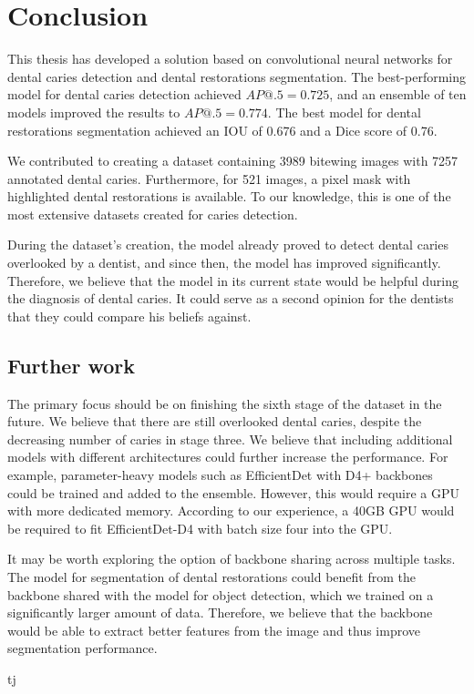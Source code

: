 \chapter{Conclusion}

This thesis has developed a solution based on convolutional neural networks for dental caries detection and dental restorations segmentation. The best-performing model for dental caries detection achieved $AP@.5=0.725$, and an ensemble of ten models improved the results to $AP@.5=0.774$. The best model for dental restorations segmentation achieved an IOU of 0.676 and a Dice score of 0.76.

\medskip
We contributed to creating a dataset containing 3989 bitewing images with 7257 annotated dental caries. Furthermore, for 521 images, a pixel mask with highlighted dental restorations is available. To our knowledge, this is one of the most extensive datasets created for caries detection.

\medskip
During the dataset's creation, the model already proved to detect dental caries overlooked by a dentist, and since then, the model has improved significantly. Therefore, we believe that the model in its current state would be helpful during the diagnosis of dental caries. It could serve as a second opinion for the dentists that they could compare his beliefs against.

\section*{Further work}
The primary focus should be on finishing the sixth stage of the dataset in the future. We believe that there are still overlooked dental caries, despite  the decreasing number of caries in stage three.
\medskip
We believe that including additional models with different architectures could further increase the performance. For example, parameter-heavy models such as EfficientDet with D4+ backbones could be trained and added to the ensemble. However, this would require a GPU with more dedicated memory. According to our experience, a 40GB GPU would be required to fit EfficientDet-D4 with batch size four into the GPU.

\medskip
It may be worth exploring the option of backbone sharing across multiple tasks. The model for segmentation of dental restorations could benefit from the backbone shared with the model for object detection, which we trained on a significantly larger amount of data. Therefore, we believe that the backbone would be able to extract better features from the image and thus improve segmentation performance.



tj